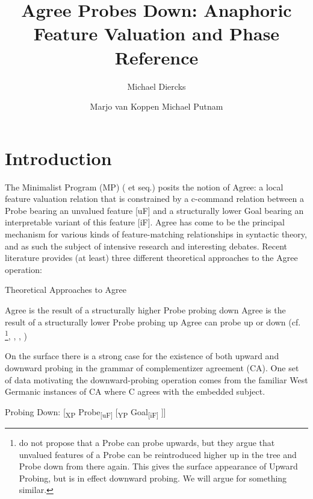 \documentclass[output=paper
,modfonts
,nonflat
]{langsci/langscibook}
\title{Agree Probes Down: Anaphoric Feature Valuation and Phase Reference
}
\author{Michael Diercks\affiliation{Pomona College}\and 
 Marjo van Koppen\affiliation{Utrecht University/Meertens Institute}\lastand 
 Michael Putnam\affiliation{Penn State University}
}
\begin{document}
\maketitle


\section{Introduction} \label{Introduction}

The Minimalist Program (MP) (\citealt{Chomsky:2000} et seq.) posits the notion of Agree: a local feature valuation relation that is constrained by a c-command relation between a Probe bearing an unvalued feature [uF] and a structurally lower Goal bearing an interpretable variant of this feature [iF]. Agree has come to be the principal mechanism for various kinds of feature-matching relationships in syntactic theory, and as such the subject of intensive research and interesting debates. Recent literature provides (at least) three different theoretical approaches to the Agree operation:

\ea
Theoretical Approaches to Agree \label{TheoryApproaches}
\begin{xlist}
\ex Agree is the result of a structurally higher Probe probing down \citep{Chomsky:2000, Chomsky:2001a, Preminger:2013, Polinsky:2015} 
\ex Agree is the result of a structurally lower Probe probing up \citep{Zeijlstra:2012, Wurmbrand:2011, Bjorkman:toappearb} 
\ex Agree can probe up or down (cf. \citealt{Bejar:2009}\footnote{\citet{Bejar:2009} do not propose that a Probe can probe upwards, but they argue that unvalued features of a Probe can be reintroduced higher up in the tree and Probe down from there again. This gives the surface appearance of Upward Probing, but is in effect downward probing. We will argue for something similar.}, \citealt{Baker:2008}, \citealt{Putnam:2011}, \citealt{Carstens:2016})
\end{xlist}
\z

On the surface there is a strong case for the existence of both upward and downward probing in the grammar of complementizer agreement (CA). One set of data motivating the downward-probing operation comes from the familiar West Germanic instances of CA where C agrees with the embedded subject.

\ea \label{ProbeDownSchematic}
Probing Down: [\textsubscript{XP} Probe\textsubscript{[uF]} [\textsubscript{YP} Goal\textsubscript{[iF]} ]]
\z
\end{document}
